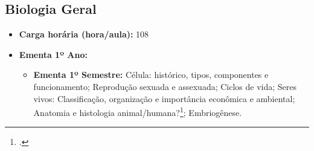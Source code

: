 \documentclass[11pt,fleqn]{book} %
\newcommand{\VER}[1]{\begingroup\color{red}#1\endgroup}
\begin{document}
\subsection{Biologia Geral}\label{disc:biologia}
\begin{itemize}
	\item \textbf{Carga horária (hora/aula):} 108
	\item \textbf{Ementa 1º Ano:}
	\begin{itemize}
		\item \textbf{Ementa 1º Semestre:} 
		Célula: histórico, tipos, componentes e funcionamento; 
		Reprodução sexuada e assexuada; 
		Ciclos de vida; 
		Seres vivos: Classificação, organização e importância econômica e ambiental; 
		Anatomia e histologia animal/\VER{humana?}\footcite{Sugestao da prof. Haissa};
		Embriogênese.
		

\end{itemize}
\end{itemize}
\end{document}
